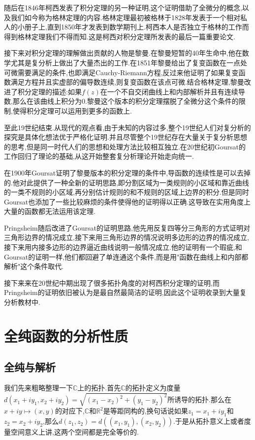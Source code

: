 随后在1846年柯西发表了积分定理的另一种证明,这个证明借助了全微分的概念,以及我们如今称为格林定理的内容.格林定理最初被格林于1828年发表于一个相对私人的小册子上,直到1850年才发表到数学期刊上.柯西本人是否独立于格林的工作而得到格林定理我们不得而知.这是柯西对积分定理所发表的最后一篇重要论文.

接下来对积分定理的理解做出贡献的人物是黎曼.在黎曼短暂的40年生命中,他在数学尤其是复分析上做出了大量杰出的工作.在1851年黎曼给出了复变函数在一点处可微需要满足的条件,也即满足Cauchy-Riemann方程,反过来他证明了如果复变函数满足方程并且实虚部的偏导数连续,则复变函数在该点可微.结合格林定理,黎曼改进了积分定理的描述:如果$f(z)$在一个不自交闭曲线上和内部解析并且有连续导数,那么在该曲线上积分为0.黎曼这个版本的积分定理摆脱了全微分这个条件的限制,使得积分定理可以运用到更多的函数上.

至此19世纪结束.从现代的观点看,由于未知的内容过多,整个19世纪人们对复分析的探究是具体化想法优于严格化证明.并且尽管整个19世纪存在大量关于复分析思想的思考,但是同一时代人们的思想和处理方法比较相互独立.在20世纪初Goursat的工作回归了理论的基础,从这开始整套复分析理论开始走向统一.

在1900年Goursat证明了黎曼版本的积分定理的条件中,导函数的连续性是可以去掉的.他对此提供了一种全新的证明思路,即分割区域为一类规则的小区域和靠近曲线的一类不规则的小区域,再分别估计规则的和不规则的区域上边界的积分.但是同时Goursat也添加了一些比较麻烦的条件使得他的证明得以正确.这导致在实用角度上大量的函数都无法运用该定理.

Pringsheim随后改进了Goursat的证明思路,他先用反复四等分三角形的方式证明对三角形边界的情况成立,接下来用三角形边界的情况说明多边形的边界的情况成立,接下来用内接多边形的边界逼近曲线说明一般情况成立.他的证明有一个瑕疵,和Goursat的证明一样,他们都回避了单连通这个条件,而是用"函数在曲线上和内部都解析"这个条件取代.

接下来来在20世纪中期出现了很多拓扑角度的对柯西积分定理的证明,而Pringsheim的证明依旧被认为是最自然最简洁的证明,因此这个证明收录到大量复分析教材中.
\newpage
\section{全纯函数的分析性质}
\subsection{全纯与解析}

我们先来粗略整理一下$\mathbb{C}$上的拓扑.首先$\mathbb{C}$的拓扑定义为度量$d(x_1+iy_1,x_2+iy_2)=\sqrt{(x_1-x_2)^2+(y_1-y_2)^2}$所诱导的拓扑.那么在$x+iy\mapsto (x,y)$的对应下,$\mathbb{C}$和$\mathbb{R}^2$是等距同构的,换句话说如果$z_1=x_1+iy_1$和$z_2=x_2+iy_2$,那么$d(z_1,z_2)=d((x_1,y_1),(x_2,y_2))$.于是从拓扑意义上或者度量空间意义上讲,这两个空间都是完全等价的.

